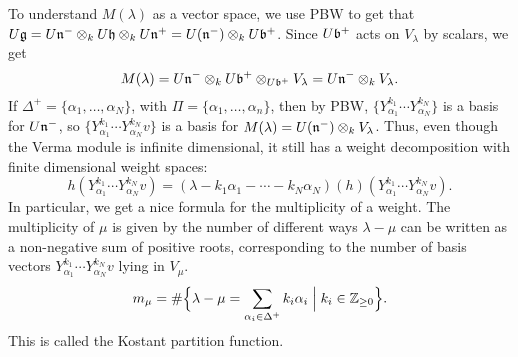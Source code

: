  To understand $M(\lambda)$ as a vector space, we use PBW to get that
 $U\mathfrak{g} = U\mathfrak{n}^-\otimes_k U\mathfrak{h} \otimes_k U\mathfrak{n}^+ = U(\mathfrak{n}^-)\otimes_k U\mathfrak{b}^+$. Since $U\mathfrak{b}^+$
 acts on $V_\lambda$ by scalars, we get
 \[
   M(\lambda) = U\mathfrak{n}^-\otimes_k U\mathfrak{b}^+\otimes_{U\mathfrak{b}^+} V_\lambda = U\mathfrak{n}^- \otimes_k V_\lambda.
 \]
 If $\Delta^+ = \{\alpha_1,\dots, \alpha_N\}$, with $\Pi=\{\alpha_1,\dots,
 \alpha_n\}$, then by PBW, $\{Y_{\alpha_1}^{k_1}\cdots
 Y_{\alpha_N}^{k_N}\}$ is a basis for $U\mathfrak{n}^-$, so $\{Y_{\alpha_1}^{k_1}\cdots
 Y_{\alpha_N}^{k_N}v\}$ is a basis for $M(\lambda)=U(\mathfrak{n}^-)\otimes_k V_{\lambda}$.
 Thus, even though the Verma module is infinite dimensional, it still has a weight
 decomposition with finite dimensional weight spaces:
 \[
    h(Y_{\alpha_1}^{k_1}\cdots Y_{\alpha_N}^{k_N}v) = (\lambda - k_1\alpha_1
    -\cdots - k_N\alpha_N)(h)(Y_{\alpha_1}^{k_1}\cdots Y_{\alpha_N}^{k_N}v).
 \]
 In particular, we get a nice formula for the multiplicity of a weight. The
 multiplicity of $\mu$ is given by the number of different ways $\lambda-\mu$ can be
 written as a non-negative sum of positive roots, corresponding to the number of basis
 vectors $Y_{\alpha_1}^{k_1}\cdots Y_{\alpha_N}^{k_N}v$ lying in $V_\mu$.
 \[
    m_\mu = \#\Bigl\{\lambda - \mu = \sum_{\alpha_i \in \Delta^+}k_i \alpha_i\Bigm|
    k_i\in \mathbb{Z}_{\ge 0}\Bigr\}.
 \]
 This is called the Kostant partition function.

